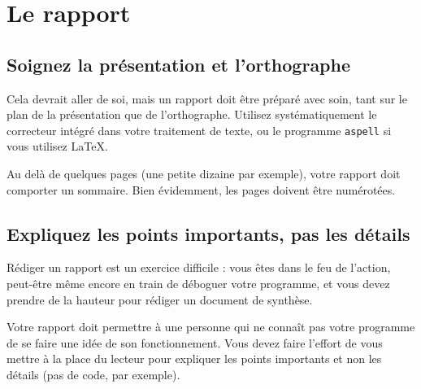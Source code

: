 \documentclass {article}
\begin{document}

\section {Le rapport}

\subsection {Soignez la présentation et l'orthographe}

Cela devrait aller de soi, mais un rapport doit être préparé avec
soin, tant sur le plan de la présentation que de l'orthographe. Utilisez
systématiquement le correcteur intégré dans votre traitement de texte,
ou le programme \texttt {aspell} si vous utilisez \LaTeX.

Au delà de quelques pages (une petite dizaine par exemple), votre
rapport doit comporter un sommaire. Bien évidemment, les pages doivent
être numérotées.


\subsection {Expliquez les points importants, pas les détails}

Rédiger un rapport est un exercice difficile :
vous êtes dans le feu de l'action,
peut-être même encore en train de déboguer votre programme, et vous
devez prendre de la hauteur pour rédiger un document de synthèse.

Votre rapport doit permettre à une personne qui ne connaît pas votre
programme de se faire une idée de son fonctionnement. Vous devez faire
l'effort de vous mettre à la place du lecteur pour expliquer
les points importants et non les détails (pas de code, par exemple).




% 
% 

\end{document}
